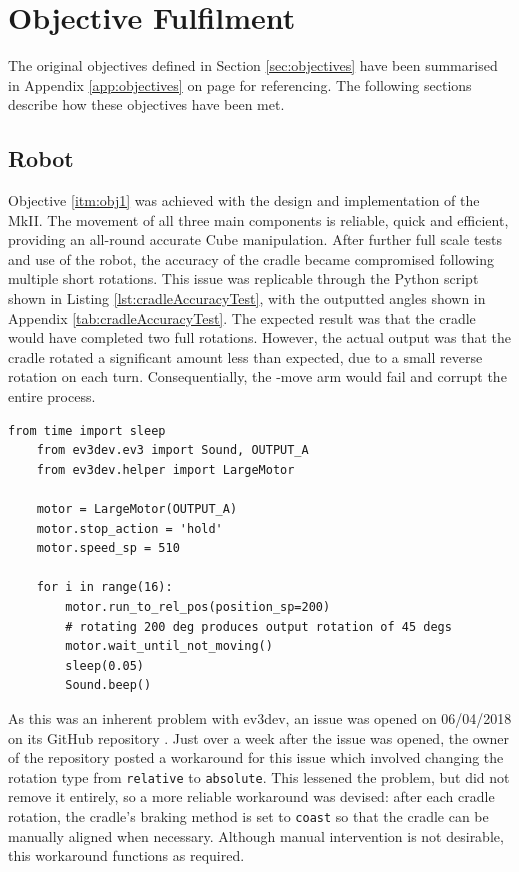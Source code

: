 \documentclass{report}
\newcommand{\move}[1]{\uppercase{\texttt{\formatmovesnospace{#1}}}-move}
\begin{document}
    \section{Objective Fulfilment}
    
    The original objectives defined in Section \ref{sec:objectives} have been summarised in Appendix \ref{app:objectives} on page \pageref{app:objectives} for referencing. The following sections describe how these objectives have been met.    
    
    \subsection{Robot}
    
    Objective \ref{itm:obj1} was achieved with the design and implementation of the MkII. The movement of all three main components is reliable, quick and efficient, providing an all-round accurate Cube manipulation. After further full scale tests and use of the robot, the accuracy of the cradle became compromised following multiple short rotations. This issue was replicable through the Python script shown in Listing \ref{lst:cradleAccuracyTest}, with the outputted angles shown in Appendix \ref{tab:cradleAccuracyTest}. The expected result was that the cradle would have completed two full rotations. However, the actual output was that the cradle rotated a significant amount less than expected, due to a small reverse rotation on each turn. Consequentially, the \move{x} arm would fail and corrupt the entire process.

    \begin{lstlisting}[caption={A short script to test the cradle's accuracy}, label={lst:cradleAccuracyTest}]
    from time import sleep
    from ev3dev.ev3 import Sound, OUTPUT_A
    from ev3dev.helper import LargeMotor
    
    motor = LargeMotor(OUTPUT_A)
    motor.stop_action = 'hold'
    motor.speed_sp = 510
    
    for i in range(16):
	    motor.run_to_rel_pos(position_sp=200)
	    # rotating 200 deg produces output rotation of 45 degs
	    motor.wait_until_not_moving()
	    sleep(0.05)
	    Sound.beep()\end{lstlisting}
    
    As this was an inherent problem with ev3dev, an issue was opened on 06/04/2018 on its GitHub repository \cite{Worgarside2018}. Just over a week after the issue was opened, the owner of the repository posted a workaround for this issue which involved changing the rotation type from \lstinline|relative| to \lstinline|absolute|. This lessened the problem, but did not remove it entirely, so a more reliable workaround was devised: after each cradle rotation, the cradle's braking method is set to \lstinline|coast| so that the cradle can be manually aligned when necessary. Although manual intervention is not desirable, this workaround functions as required.
    
\end{document}
